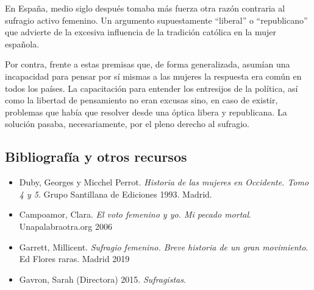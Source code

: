 \documentclass[
]{article}
\providecommand{\tightlist}{%
  \setlength{\itemsep}{0pt}\setlength{\parskip}{0pt}}
\begin{document}
En España, medio siglo después tomaba más fuerza otra razón contraria al
sufragio activo femenino. Un argumento supuestamente ``liberal'' o
``republicano'' que advierte de la excesiva influencia de la tradición
católica en la mujer española.

Por contra, frente a estas premisas que, de forma generalizada, asumían
una incapacidad para pensar por sí mismas a las mujeres la respuesta era
común en todos los países. La capacitación para entender los entresijos
de la política, así como la libertad de pensamiento no eran excusas
sino, en caso de existir, problemas que había que resolver desde una
óptica libera y republicana. La solución pasaba, necesariamente, por el
pleno derecho al sufragio.

\hypertarget{bibliografuxeda-y-otros-recursos}{%
\subsection{Bibliografía y otros
recursos}\label{bibliografuxeda-y-otros-recursos}}

\begin{itemize}
\tightlist
\item
  Duby, Georges y Micchel Perrot. \emph{Historia de las mujeres en
  Occidente. Tomo 4 y 5}. Grupo Santillana de Ediciones 1993. Madrid.
\item
  Campoamor, Clara. \emph{El voto femenino y yo. Mi pecado mortal}.
  Unapalabraotra.org 2006
\item
  Garrett, Millicent. \emph{Sufragio femenino. Breve historia de un gran
  movimiento}. Ed Flores raras. Madrid 2019
\item
  Gavron, Sarah (Directora) 2015. \emph{Sufragistas}.
\end{itemize}
\end{document}
